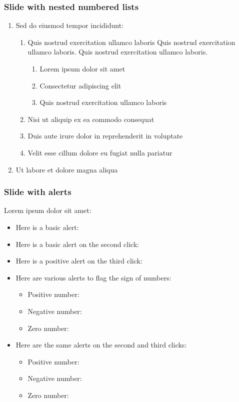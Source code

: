 \documentclass[11pt,xcolor={dvipsnames},hyperref={pdftex,pdfpagemode=UseNone,hidelinks,pdfdisplaydoctitle=true},usepdftitle=false]{beamer}
\begin{document}
\begin{frame}
\frametitle{Slide with nested numbered lists}
\begin{enumerate}
\item Sed do eiusmod tempor incididunt:
\begin{enumerate}
\item Quis nostrud exercitation ullamco laboris Quis nostrud exercitation ullamco laboris. Quis nostrud exercitation ullamco laboris. 
\begin{enumerate}
\item Lorem ipsum dolor sit amet
\item Consectetur adipiscing elit
\item Quis nostrud exercitation ullamco laboris
\end{enumerate}
\item Nisi ut aliquip ex ea commodo consequat
\item Duis aute irure dolor in reprehenderit in voluptate
\item Velit esse cillum dolore eu fugiat nulla pariatur
\end{enumerate}
\item Ut labore et dolore magna aliqua
\end{enumerate}
\end{frame}

\begin{frame}
\frametitle{Slide with alerts}
Lorem ipsum dolor sit amet:
\begin{itemize}
\item Here is a basic alert: 
\item Here is a basic alert on the second click: 
\item Here is a positive alert on the third click: 
\item Here are various alerts to flag the sign of numbers:
\begin{itemize}
\item Positive number: 
\item Negative number: 
\item Zero number: 
\end{itemize}
\item Here are the same alerts on the second and third clicks:
\begin{itemize}
\item Positive number: 
\item Negative number: 
\item Zero number: 
\end{itemize}
\end{itemize}
\end{frame}
\end{document}
